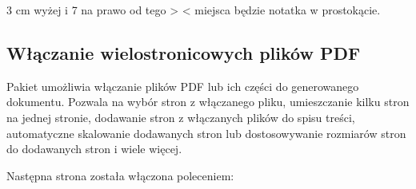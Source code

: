 \documentclass[fontSize=10pt, rmargin=3cm, extra]{pdfArticle}
\begin{document}
3 cm wyżej i 7 na prawo od tego >  < miejsca będzie notatka w prostokącie.

\subsection{Włączanie wielostronicowych plików PDF}

Pakiet  umożliwia włączanie plików PDF lub ich części do generowanego dokumentu. Pozwala na wybór stron z włączanego pliku, umieszczanie kilku stron na jednej stronie, dodawanie stron z włączanych plików do spisu treści, automatyczne skalowanie dodawanych stron lub dostosowywanie rozmiarów stron do dodawanych stron i wiele więcej.

Następna strona została włączona poleceniem:

\begin{CatchExample}

\end{CatchExample}

\putExampleVerbatimAdjust

\putExampleTeX
\end{document}
